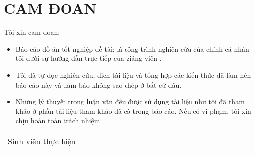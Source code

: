 \chapter*{CAM ĐOAN}
\fontsize{13px}{16.5px}\selectfont
\justifying
Tôi xin cam đoan:
\begin{itemize}
	\item Báo cáo đồ án tốt nghiệp đề tài: \emph{\@title} là công trình nghiên cứu của chính cá nhân tôi dưới sự hướng dẫn trực tiếp của giảng viên \advisor.
	\item Tôi đã tự đọc nghiên cứu, dịch tài liệu và tổng hợp các kiến thức đã làm nên báo cáo này và đảm bảo không sao chép ở bất cứ đâu.
	\item Những lý thuyết trong luận văn đều được sử dụng tài liệu như tôi đã tham khảo ở phần tài liệu tham khảo đã có trong báo cáo. Nếu có vi phạm, tôi xin chịu hoàn toàn trách nhiệm.
\end{itemize}

\vspace{1cm}

\hspace*{\fill}
\begin{tabular}{c}  %
	{\large Sinh viên thực hiện}
	\vspace{3cm}\\
	\@author
\end{tabular}

